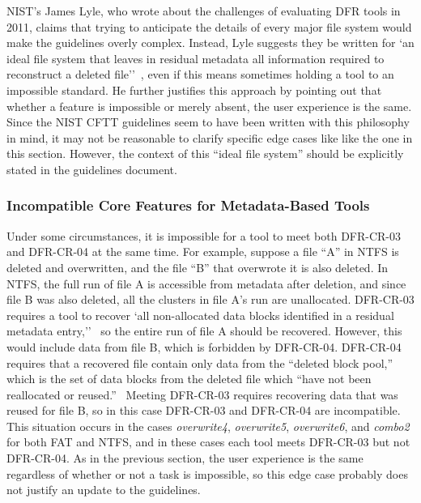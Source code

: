 NIST's James Lyle, who wrote about the challenges of evaluating DFR tools in 2011, 
claims that trying to anticipate the details of every major file system would make the guidelines overly complex. 
Instead, Lyle suggests they be written for `an ideal file system that leaves in 
residual metadata  all  information  required  to  reconstruct  a  deleted  file''~\cite{lyle2011-ICDF2C}, even if this means sometimes holding a tool to an impossible standard.
He further justifies this approach by pointing out that whether a feature is impossible or merely absent, the user experience is the same.
Since the NIST CFTT guidelines seem to have been written with this philosophy in mind, it may not be reasonable to clarify specific edge cases like like the one in this section.
However, the context of this ``ideal file system'' should be explicitly stated in the guidelines document.

\subsubsection{Incompatible Core Features for Metadata-Based Tools}

Under some circumstances, it is impossible for a tool to meet both DFR-CR-03 and DFR-CR-04 at the same time.
For example, suppose a file ``A'' in NTFS is deleted and overwritten, and the file ``B'' that overwrote it is also deleted.
In NTFS, the full run of file A is accessible from metadata after deletion, and since file B was also deleted, all the clusters in file A's run are unallocated.
DFR-CR-03 requires a tool to recover `all non-allocated data blocks identified in a residual metadata entry,''~\cite{meta:dfr:standards} so the entire run of file A should be recovered.
However, this would include data from file B, which is forbidden by DFR-CR-04.
DFR-CR-04 requires that a recovered file contain only data from the ``deleted block pool,'' which is the set of data blocks from the deleted file which ``have not been reallocated or reused.''~\cite{meta:dfr:standards}
Meeting DFR-CR-03 requires recovering data that was reused for file B, so in this case DFR-CR-03 and DFR-CR-04 are incompatible.
This situation occurs in the cases \emph{overwrite4}, \emph{overwrite5}, \emph{overwrite6}, and \emph{combo2} for both FAT and NTFS, and in these cases each tool meets DFR-CR-03 but not DFR-CR-04.
As in the previous section, the user experience is the same regardless of whether or not a task is impossible, so this edge case probably does not justify an update to the guidelines.



